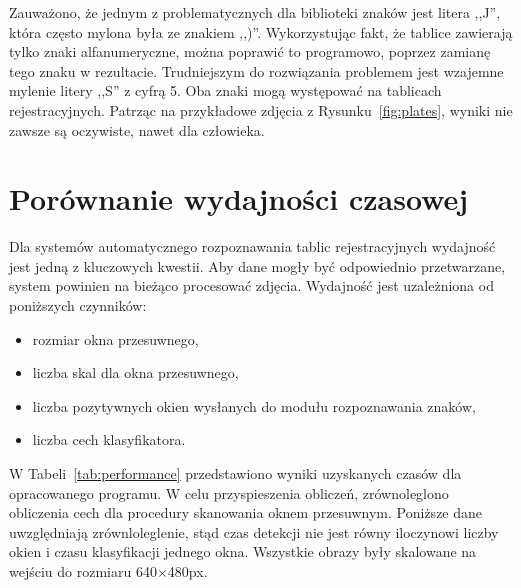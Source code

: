 Zauważono, że jednym z problematycznych dla biblioteki znaków jest litera ,,J'', która często mylona była ze znakiem ,,)''.
Wykorzystując fakt, że tablice zawierają tylko znaki alfanumeryczne, można poprawić to programowo, poprzez zamianę tego znaku w rezultacie.
Trudniejszym do rozwiązania problemem jest wzajemne mylenie litery ,,S'' \linebreak z cyfrą 5.
Oba znaki mogą występować na tablicach rejestracyjnych.
Patrząc na przykładowe zdjęcia z Rysunku~\ref{fig:plates}, wyniki nie zawsze są oczywiste, nawet dla człowieka.



\section{Porównanie wydajności czasowej}
Dla systemów automatycznego rozpoznawania tablic rejestracyjnych wydajność jest jedną z kluczowych kwestii.
Aby dane mogły być odpowiednio przetwarzane, system powinien na bieżąco procesować zdjęcia.
Wydajność jest uzależniona od poniższych czynników:
\begin{itemize}
    \item rozmiar okna przesuwnego,
    \item liczba skal dla okna przesuwnego,
    \item liczba pozytywnych okien wysłanych do modułu rozpoznawania znaków,
    \item liczba cech klasyfikatora.
\end{itemize}
W Tabeli~\ref{tab:performance} przedstawiono wyniki uzyskanych czasów dla opracowanego programu.
\linebreak W celu przyspieszenia obliczeń, zrównoleglono obliczenia cech dla procedury skanowania oknem przesuwnym.
Poniższe dane uwzględniają zrównloleglenie, stąd czas detekcji nie jest równy iloczynowi liczby okien i czasu klasyfikacji jednego okna.
Wszystkie obrazy były skalowane na wejściu do rozmiaru 640$\times$480px.
